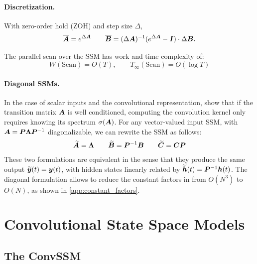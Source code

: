 \documentclass{article}
\newcommand{\TS}[1]{\par\noindent{\color{red}[TS]: #1}\par}
\begin{document}
\paragraph{Discretization.}
With zero-order hold (ZOH) and step size $\Delta$,
\begin{equation}
\label{eq:zoh}
\overline{\bm{A}} = e^{\Delta \bm{A}}
\qquad
\overline{\bm{B}} = (\Delta \bm{A})^{-1} (e^{\Delta \bm{A}} - \bm{I}) \cdot \Delta \bm{B} .
\end{equation}

\begin{proposition}
\label{prop:SSM_complexity}
    The parallel scan over the SSM has work and time complexity of:
\[
    W(\mathrm{Scan}) = O(T), \qquad T_\infty(\mathrm{Scan}) = O(\log T)
\]
\end{proposition}

\paragraph{Diagonal SSMs.} In the case of scalar inputs and the convolutional representation, \citet{gu2022s4d} show that if the transition matrix $\bm{A}$ is well conditioned, computing the convolution kernel only requires knowing its spectrum $\sigma(\bm{A})$. For any vector-valued input SSM, with $\bm{A} = \bm{P} \bm{\Lambda} \bm{P}^{-1}$ diagonalizable, we can rewrite the SSM as follows:
%
\begin{align}
\label{eq:ssm:diagonal}
\widetilde{\bm{A}} = \bm{\Lambda} \qquad \widetilde{\bm{B}} = \bm{P}^{-1} \bm{B} \qquad \widetilde{\bm{C}} = \bm{C} \bm{P}
\end{align}
These two formulations are equivalent in the sense that they produce the same output $\widetilde{\bm{y}}(t)=\bm{y}(t)$, with hidden states linearly related by $\widetilde{\bm{h}}(t) = \bm{P}^{-1} \bm{h}(t)$. The diagonal formulation allows to reduce the constant factors in  from $O(N^3)$ to $O(N)$, as shown in \cref{app:constant_factors}.


\section{Convolutional State Space Models}

\subsection{The ConvSSM}
\label{sec:horizontal_connections}
\end{document}
